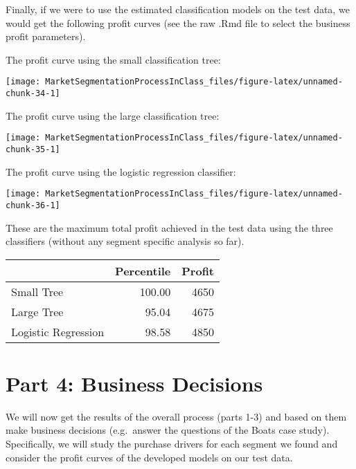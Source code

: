 \documentclass[
]{article}
\begin{document}
Finally, if we were to use the estimated classification models on the
test data, we would get the following profit curves (see the raw .Rmd
file to select the business profit parameters).

The profit curve using the small classification tree:

\begin{center}\texttt{[image: MarketSegmentationProcessInClass\_files/figure-latex/unnamed-chunk-34-1]} \end{center}

The profit curve using the large classification tree:

\begin{center}\texttt{[image: MarketSegmentationProcessInClass\_files/figure-latex/unnamed-chunk-35-1]} \end{center}

The profit curve using the logistic regression classifier:

\begin{center}\texttt{[image: MarketSegmentationProcessInClass\_files/figure-latex/unnamed-chunk-36-1]} \end{center}

These are the maximum total profit achieved in the test data using the
three classifiers (without any segment specific analysis so far).

\begin{center}
\begin{longtable}{lrr}
\toprule
  & Percentile & Profit\\
\midrule
Small Tree & 100.00 & 4650\\
Large Tree & 95.04 & 4675\\
Logistic Regression & 98.58 & 4850\\
\bottomrule
\end{longtable}\end{center}

\clearpage

\hypertarget{part-4-business-decisions}{%
\section{Part 4: Business Decisions}\label{part-4-business-decisions}}

We will now get the results of the overall process (parts 1-3) and based
on them make business decisions (e.g.~answer the questions of the Boats
case study). Specifically, we will study the purchase drivers for each
segment we found and consider the profit curves of the developed models
on our test data.
\end{document}

